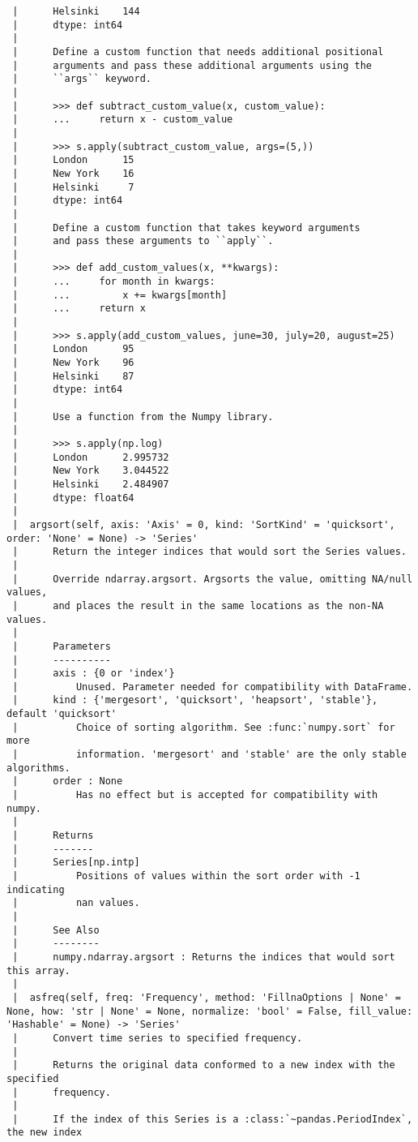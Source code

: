 \documentclass[
  letterpaper,
  DIV=11,
  numbers=noendperiod]{scrreprt}
\begin{document}
\begin{verbatim}
 |      Helsinki    144
 |      dtype: int64
 |      
 |      Define a custom function that needs additional positional
 |      arguments and pass these additional arguments using the
 |      ``args`` keyword.
 |      
 |      >>> def subtract_custom_value(x, custom_value):
 |      ...     return x - custom_value
 |      
 |      >>> s.apply(subtract_custom_value, args=(5,))
 |      London      15
 |      New York    16
 |      Helsinki     7
 |      dtype: int64
 |      
 |      Define a custom function that takes keyword arguments
 |      and pass these arguments to ``apply``.
 |      
 |      >>> def add_custom_values(x, **kwargs):
 |      ...     for month in kwargs:
 |      ...         x += kwargs[month]
 |      ...     return x
 |      
 |      >>> s.apply(add_custom_values, june=30, july=20, august=25)
 |      London      95
 |      New York    96
 |      Helsinki    87
 |      dtype: int64
 |      
 |      Use a function from the Numpy library.
 |      
 |      >>> s.apply(np.log)
 |      London      2.995732
 |      New York    3.044522
 |      Helsinki    2.484907
 |      dtype: float64
 |  
 |  argsort(self, axis: 'Axis' = 0, kind: 'SortKind' = 'quicksort', order: 'None' = None) -> 'Series'
 |      Return the integer indices that would sort the Series values.
 |      
 |      Override ndarray.argsort. Argsorts the value, omitting NA/null values,
 |      and places the result in the same locations as the non-NA values.
 |      
 |      Parameters
 |      ----------
 |      axis : {0 or 'index'}
 |          Unused. Parameter needed for compatibility with DataFrame.
 |      kind : {'mergesort', 'quicksort', 'heapsort', 'stable'}, default 'quicksort'
 |          Choice of sorting algorithm. See :func:`numpy.sort` for more
 |          information. 'mergesort' and 'stable' are the only stable algorithms.
 |      order : None
 |          Has no effect but is accepted for compatibility with numpy.
 |      
 |      Returns
 |      -------
 |      Series[np.intp]
 |          Positions of values within the sort order with -1 indicating
 |          nan values.
 |      
 |      See Also
 |      --------
 |      numpy.ndarray.argsort : Returns the indices that would sort this array.
 |  
 |  asfreq(self, freq: 'Frequency', method: 'FillnaOptions | None' = None, how: 'str | None' = None, normalize: 'bool' = False, fill_value: 'Hashable' = None) -> 'Series'
 |      Convert time series to specified frequency.
 |      
 |      Returns the original data conformed to a new index with the specified
 |      frequency.
 |      
 |      If the index of this Series is a :class:`~pandas.PeriodIndex`, the new index

\end{verbatim}
\end{document}
